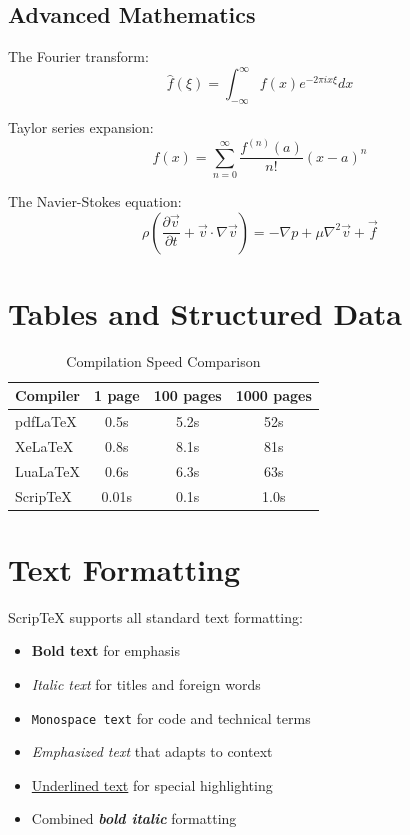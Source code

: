 \documentclass[12pt,a4paper]{article}
\begin{document}
\subsection{Advanced Mathematics}

The Fourier transform:
$$\hat{f}(\xi) = \int_{-\infty}^{\infty} f(x) e^{-2\pi i x \xi} dx$$

Taylor series expansion:
$$f(x) = \sum_{n=0}^{\infty} \frac{f^{(n)}(a)}{n!}(x-a)^n$$

The Navier-Stokes equation:
$$\rho \left(\frac{\partial \vec{v}}{\partial t} + \vec{v} \cdot \nabla \vec{v}\right) = -\nabla p + \mu \nabla^2 \vec{v} + \vec{f}$$

\section{Tables and Structured Data}

\begin{table}[htbp]
\centering
\caption{Compilation Speed Comparison}
\label{tab:comparison}
\begin{tabular}{|l|c|c|c|}
\hline
Compiler & 1 page & 100 pages & 1000 pages \\
\hline
pdfLaTeX & 0.5s & 5.2s & 52s \\
XeLaTeX & 0.8s & 8.1s & 81s \\
LuaLaTeX & 0.6s & 6.3s & 63s \\
ScripTeX & 0.01s & 0.1s & 1.0s \\
\hline
\end{tabular}
\end{table}

\section{Text Formatting}

ScripTeX supports all standard text formatting:

\begin{itemize}
\item \textbf{Bold text} for emphasis
\item \textit{Italic text} for titles and foreign words
\item \texttt{Monospace text} for code and technical terms
\item \emph{Emphasized text} that adapts to context
\item \underline{Underlined text} for special highlighting
\item Combined \textbf{\textit{bold italic}} formatting
\end{itemize}
\end{document}
